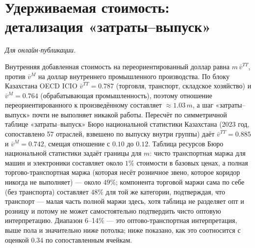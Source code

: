 \documentclass[12pt]{article}
\begin{document}
\section{Удерживаемая стоимость: детализация «затраты--выпуск»}\label{app:io}
\emph{Для онлайн-публикации.}

\medskip
Внутренняя добавленная стоимость на переориентированный доллар равна $m\,\bar v^{TT}$,
против $\bar v^{M}$ на доллар внутреннего промышленного производства. По блоку Казахстана
OECD ICIO $\bar v^{TT} = 0.787$ (торговля, транспорт, складское хозяйство) и
$\bar v^{M} = 0.764$ (обрабатывающая промышленность), поэтому отношение
переориентированного к произведённому составляет $\approx 1.03\,m$, а шаг
«затраты--выпуск» почти не выполняет никакой работы. Пересчёт по симметричной таблице
«затраты--выпуск» Бюро национальной статистики Казахстана (2023 год, сопоставлено 57
отраслей, взвешено по выпуску внутри группы) даёт $\bar v^{TT} = 0.885$ и
$\bar v^{M} = 0.742$, смещая отношение с $0.10$ до $0.12$. Таблица ресурсов Бюро
национальной статистики задаёт границы для $m$: чисто транспортная маржа для машин и
электроники составляет около $1\%$ стоимости в базовых ценах, а полная торгово-транспортная
маржа (которая несёт розничное звено, которое коридор никогда не выполняет) — около $49\%$;
компонента торговой маржи сама по себе (без транспорта) составляет $48\%$ для той же
категории, подтверждая, что транспорт — малая часть полной маржи здесь, хотя таблица не
разделяет опт и розницу и потому не может самостоятельно подтвердить чисто оптовую
интерпретацию. Диапазон 6--14\% — это оптово-транспортная интерпретация, выше пола и
значительно ниже потолка; ниже показано, как это соотносится с оценкой $0.34$ по
сопоставленным ячейкам.
\end{document}
